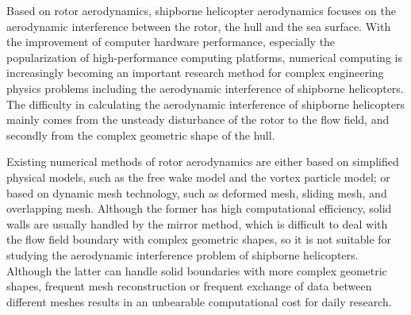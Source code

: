 \begin{eabstract}
Based on rotor aerodynamics, shipborne helicopter aerodynamics focuses on the aerodynamic interference between the rotor, the hull and the sea surface.
With the improvement of computer hardware performance, especially the popularization of high-performance computing platforms, numerical computing is increasingly becoming an important research method for complex engineering physics problems including the aerodynamic interference of shipborne helicopters.
The difficulty in calculating the aerodynamic interference of shipborne helicopters mainly comes from the unsteady disturbance of the rotor to the flow field, and secondly from the complex geometric shape of the hull.

Existing numerical methods of rotor aerodynamics are either based on simplified physical models, such as the free wake model and the vortex particle model; or based on dynamic mesh technology, such as deformed mesh, sliding mesh, and overlapping mesh.
Although the former has high computational efficiency, solid walls are usually handled by the mirror method, which is difficult to deal with the flow field boundary with complex geometric shapes, so it is not suitable for studying the aerodynamic interference problem of shipborne helicopters.
Although the latter can handle solid boundaries with more complex geometric shapes, frequent mesh reconstruction or frequent exchange of data between different meshes results in an unbearable computational cost for daily research.


\end{eabstract}

